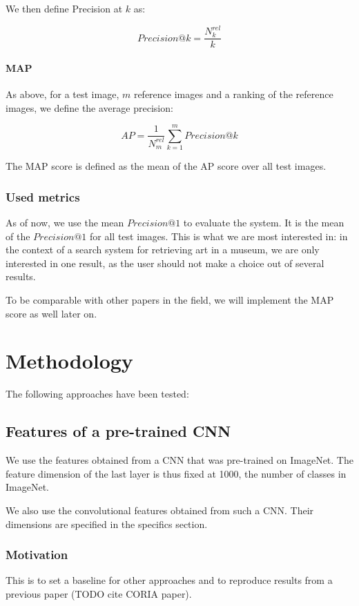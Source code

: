 \documentclass[fleqn]{article}
\begin{document}
We then define Precision at $k$ as:

\begin{equation}
Precision@k = \frac{N^{rel}_k}{k}
\end{equation}

\paragraph{MAP}
As above, for a test image, $m$ reference images and a ranking
of the reference images, we define the average precision:

\begin{equation}
AP = \frac{1}{N^{rel}_m} \sum_{k=1}^m Precision@k
\end{equation}

The MAP score is defined as the mean of the AP score over all test images.

\subsubsection{Used metrics}
As of now, we use the mean $Precision@1$ to evaluate the system.
It is the mean of the $Precision@1$ for all test images.
This is what we are most interested in: in the context of a
search system for retrieving art in a museum, we are only
interested in one result, as the user should not make a choice
out of several results.

To be comparable with other papers in the field, we will implement
the MAP score as well later on.

\section{Methodology}
The following approaches have been tested:

\subsection{Features of a pre-trained CNN}\label{sec:cnnplain}
We use the features obtained from a CNN that was pre-trained on ImageNet.
The feature dimension of the last layer is thus
fixed at 1000, the number of classes in ImageNet.

We also use the convolutional features obtained from such a CNN.
Their dimensions are specified in{} the specifics section.
\subsubsection{Motivation}
This is to set a baseline for other approaches and to reproduce results
from a previous paper (TODO cite CORIA paper).
\end{document}
